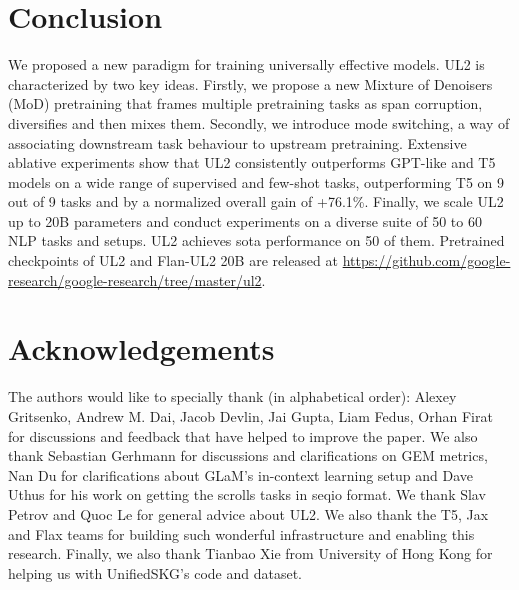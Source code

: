 \documentclass[10pt]{article}
\begin{document}
\section{Conclusion} 
We proposed a new paradigm for training universally effective models. UL2 is characterized by two key ideas. Firstly, we propose a new Mixture of Denoisers (MoD) pretraining that frames multiple pretraining tasks as span corruption, diversifies and then mixes them. Secondly, we introduce mode switching, a way of associating downstream task behaviour to upstream pretraining. Extensive ablative experiments show that UL2 consistently outperforms GPT-like and T5 models on a wide range of supervised and few-shot tasks, outperforming T5 on 9 out of 9 tasks and by a normalized overall gain of +76.1\%. Finally, we scale UL2 up to 20B parameters and conduct experiments on a diverse suite of 50 to 60 NLP tasks and setups. UL2 achieves sota performance on 50 of them. Pretrained checkpoints of UL2 and Flan-UL2 20B are released at \url{https://github.com/google-research/google-research/tree/master/ul2}.

\newpage 
\section{Acknowledgements}
The authors would like to specially thank (in alphabetical order): Alexey Gritsenko, Andrew M.  Dai, Jacob Devlin, Jai Gupta, Liam Fedus, Orhan Firat for discussions and feedback that have helped to improve the paper. We also thank Sebastian Gerhmann for discussions and clarifications on GEM metrics, Nan Du for clarifications about GLaM's in-context learning setup and Dave Uthus for his work on getting the scrolls tasks in seqio format. We thank Slav Petrov and Quoc Le for general advice about UL2. We also thank the T5, Jax and Flax teams for building such wonderful infrastructure and enabling this research. Finally, we also thank Tianbao Xie from University of Hong Kong for helping us with UnifiedSKG's code and dataset. 
\end{document}
